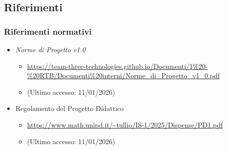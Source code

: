 \documentclass[a4paper,12pt]{article}
\begin{document}
    \subsection{Riferimenti}
        \subsubsection{Riferimenti normativi}
            \begin{itemize}
                \item \textit{Norme di Progetto v1.0}
                \begin{itemize}
                    \item \url{https://team-three-technologies.github.io/Documenti/1%20-%20RTB/Documenti%20interni/Norme_di_Progetto_v1_0.pdf}
                    \item[] (Ultimo accesso: 11/01/2026)
                \end{itemize}
                \item Regolamento del Progetto Didattico
                \begin{itemize}
                    \item \url{https://www.math.unipd.it/~tullio/IS-1/2025/Dispense/PD1.pdf}
                    \item[] (Ultimo accesso: 11/01/2026)
                \end{itemize}
            \end{itemize}
\end{document}
